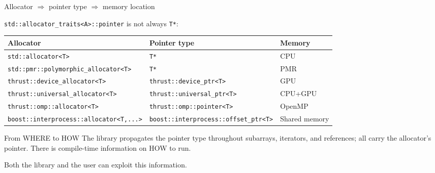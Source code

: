 \documentclass[t,aspectratio=169,handout]{beamer}
\begin{document}
\begin{frame}[fragile,label=allocator2]{Allocator $\Rightarrow$ pointer type $\Rightarrow$ memory location}

\lstinline|std::allocator_traits<A>::pointer| is not always \lstinline|T*|:

\medskip
\begin{tabular}{@{}lll@{}}
\hline
\textbf{Allocator} & \textbf{Pointer type} & \textbf{Memory} \\
\hline
\lstinline|std::allocator<T>|                        & \lstinline|T*|                                 & CPU \\
\lstinline|std::pmr::polymorphic_allocator<T>|       & \lstinline|T*|                                 & PMR \\
\lstinline|thrust::device_allocator<T>|              & \lstinline|thrust::device_ptr<T>|              & GPU \\
\lstinline|thrust::universal_allocator<T>|           & \lstinline|thrust::universal_ptr<T>|           & CPU+GPU \\
\lstinline|thrust::omp::allocator<T>|                & \lstinline|thrust::omp::pointer<T>|            & OpenMP \\
\lstinline|boost::interprocess::allocator<T,...>|    & \lstinline|boost::interprocess::offset_ptr<T>| & Shared memory \\
\hline
\end{tabular}

\medskip

\begin{alertblock}[label=allocator3]{From WHERE to HOW}
The library propagates the pointer type throughout subarrays, iterators,
and references; all carry the allocator's pointer.
There is compile-time information on HOW to run.
\end{alertblock}

Both the library and the user can exploit this information.

\end{frame}
\end{document}
